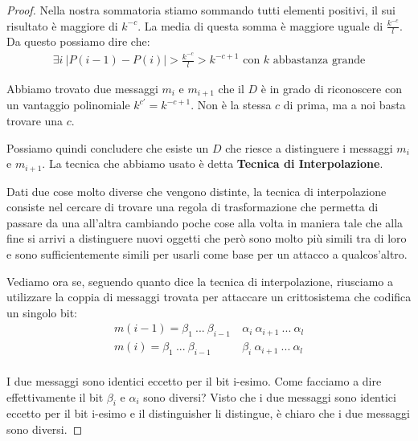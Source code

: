 \begin{proof}
\noindent Nella nostra sommatoria stiamo sommando tutti elementi positivi, il sui risultato è maggiore di $k^{-c}$. La media di questa somma è maggiore uguale di $\frac{k^{-c}}{l}$. Da questo possiamo dire che:
\begin{align*}
    \exists i \ \bigg|P(i-1) - P(i)\bigg| > \frac{k^{-c}}{l} > k^{-c+1} \text{ con $k$ abbastanza grande}
\end{align*}

\noindent Abbiamo trovato due messaggi $m_i$ e $m_{i+1}$ che il $D$ è in grado di riconoscere con un vantaggio polinomiale $k^{c'} = k^{-c+1}$. Non è la stessa $c$ di prima, ma a noi basta trovare una $c$.

Possiamo quindi concludere che esiste un $D$ che riesce a distinguere i messaggi $m_i$ e $m_{i+1}$. La tecnica che abbiamo usato è detta \textbf{Tecnica di Interpolazione}. 
\begin{definition}
Dati due cose molto diverse che vengono distinte, la tecnica di interpolazione consiste nel cercare di trovare una regola di trasformazione che permetta di passare da una all'altra cambiando poche cose alla volta in maniera tale che alla fine si arrivi a distinguere nuovi oggetti che però sono molto più simili tra di loro e sono sufficientemente simili per usarli come base per un attacco a qualcos'altro.
\end{definition}

\noindent Vediamo ora se, seguendo quanto dice la tecnica di interpolazione, riusciamo a utilizzare la coppia di messaggi trovata per attaccare un crittosistema che codifica un singolo bit:
\begin{align*}
    m(i-1) = \beta_1 \ ... \ \beta_{i-1} \ &\alpha_i \ \alpha_{i+1} \ ... \ \alpha_l\\
    m(i) = \beta_1 \ ... \ \beta_{i-1} \ &\beta_i \ \alpha_{i+1} \ ... \ \alpha_l\\
\end{align*}

\noindent I due messaggi sono identici eccetto per il bit i-esimo. Come facciamo a dire effettivamente il bit $\beta_i$ e $\alpha_i$ sono diversi? Visto che i due messaggi sono identici eccetto per il bit i-esimo e il distinguisher li distingue, è chiaro che i due messaggi sono diversi. 


\end{proof}
